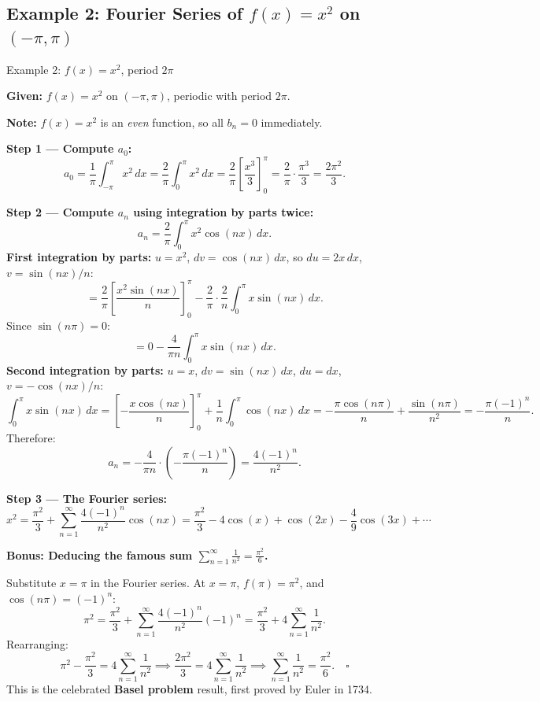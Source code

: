 \documentclass[12pt,a4paper]{article}
\begin{document}
\subsection*{Example 2: Fourier Series of $f(x) = x^2$ on $(-\pi, \pi)$}

\begin{infobox}{Example 2: $f(x) = x^2$, period $2\pi$}

\textbf{Given:} $f(x) = x^2$ on $(-\pi, \pi)$, periodic with period $2\pi$.

\medskip
\textbf{Note:} $f(x) = x^2$ is an \emph{even} function, so all $b_n = 0$ immediately.

\medskip
\textbf{Step 1 --- Compute $a_0$:}
\[
a_0 = \frac{1}{\pi}\int_{-\pi}^{\pi} x^2\,dx = \frac{2}{\pi}\int_0^{\pi}x^2\,dx
= \frac{2}{\pi}\left[\frac{x^3}{3}\right]_0^{\pi} = \frac{2}{\pi}\cdot\frac{\pi^3}{3} = \frac{2\pi^2}{3}.
\]

\medskip
\textbf{Step 2 --- Compute $a_n$ using integration by parts twice:}
\[
a_n = \frac{2}{\pi}\int_0^{\pi}x^2\cos(nx)\,dx.
\]
\textbf{First integration by parts:} $u = x^2$, $dv = \cos(nx)\,dx$, so $du = 2x\,dx$, $v = \sin(nx)/n$:
\[
= \frac{2}{\pi}\left[\frac{x^2\sin(nx)}{n}\right]_0^{\pi} - \frac{2}{\pi}\cdot\frac{2}{n}\int_0^{\pi}x\sin(nx)\,dx.
\]
Since $\sin(n\pi) = 0$:
\[
= 0 - \frac{4}{\pi n}\int_0^{\pi}x\sin(nx)\,dx.
\]
\textbf{Second integration by parts:} $u = x$, $dv = \sin(nx)\,dx$, $du = dx$, $v = -\cos(nx)/n$:
\[
\int_0^{\pi}x\sin(nx)\,dx = \left[-\frac{x\cos(nx)}{n}\right]_0^{\pi} + \frac{1}{n}\int_0^{\pi}\cos(nx)\,dx
= -\frac{\pi\cos(n\pi)}{n} + \frac{\sin(n\pi)}{n^2} = -\frac{\pi(-1)^n}{n}.
\]
Therefore:
\[
a_n = -\frac{4}{\pi n}\cdot\left(-\frac{\pi(-1)^n}{n}\right) = \frac{4(-1)^n}{n^2}.
\]

\textbf{Step 3 --- The Fourier series:}
\[
x^2 = \frac{\pi^2}{3} + \sum_{n=1}^{\infty}\frac{4(-1)^n}{n^2}\cos(nx)
= \frac{\pi^2}{3} - 4\cos(x) + \cos(2x) - \frac{4}{9}\cos(3x) + \cdots
\]

\textbf{Bonus: Deducing the famous sum $\displaystyle\sum_{n=1}^{\infty}\frac{1}{n^2} = \frac{\pi^2}{6}$.}

Substitute $x = \pi$ in the Fourier series. At $x = \pi$, $f(\pi) = \pi^2$, and $\cos(n\pi) = (-1)^n$:
\[
\pi^2 = \frac{\pi^2}{3} + \sum_{n=1}^{\infty}\frac{4(-1)^n}{n^2}(-1)^n
= \frac{\pi^2}{3} + 4\sum_{n=1}^{\infty}\frac{1}{n^2}.
\]
Rearranging:
\[
\pi^2 - \frac{\pi^2}{3} = 4\sum_{n=1}^{\infty}\frac{1}{n^2}
\implies \frac{2\pi^2}{3} = 4\sum_{n=1}^{\infty}\frac{1}{n^2}
\implies \sum_{n=1}^{\infty}\frac{1}{n^2} = \frac{\pi^2}{6}. \quad\square
\]
This is the celebrated \textbf{Basel problem} result, first proved by Euler in 1734.
\end{infobox}
\end{document}
